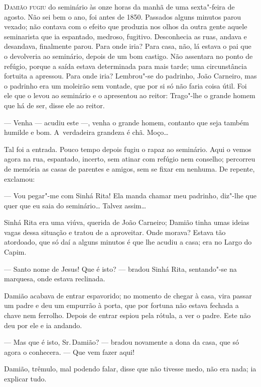 \begin{linenumbers}

\textsc{Damião fugiu} do seminário às onze horas da manhã de uma sexta"-feira de
agosto. Não sei bem o ano, foi antes de 1850. Passados alguns minutos
parou vexado; não contava com o efeito que produzia nos olhos da outra
gente aquele seminarista que ia espantado, medroso, fugitivo.
Desconhecia as ruas, andava e desandava, finalmente parou. Para onde
iria? Para casa, não, lá estava o pai que o devolveria ao seminário,
depois de um bom castigo. Não assentara no ponto de refúgio, porque a
saída estava determinada para mais tarde; uma circunstância fortuita a
apressou. Para onde iria? Lembrou"-se do padrinho, João Carneiro, mas o
padrinho era um moleirão sem vontade, que por si só não faria coisa
útil. Foi ele que o levou ao seminário e o apresentou ao reitor:
Trago"-lhe o grande homem que há de ser, disse ele ao reitor.

--- Venha --- acudiu este ---, venha o grande homem, contanto que seja
também humilde e bom. A~verdadeira grandeza é chã. Moço\ldots{}

Tal foi a entrada. Pouco tempo depois fugiu o rapaz ao seminário. Aqui o
vemos agora na rua, espantado, incerto, sem atinar com refúgio nem
conselho; percorreu de memória as casas de parentes e amigos, sem se
fixar em nenhuma. De repente, exclamou:

--- Vou pegar"-me com Sinhá Rita! Ela manda chamar meu padrinho, diz"-lhe
que quer que eu saia do seminário\ldots{} Talvez assim\ldots{}

Sinhá Rita era uma viúva, querida de João Carneiro; Damião tinha umas
ideias vagas dessa situação e tratou de a aproveitar. Onde morava?
Estava tão atordoado, que só daí a alguns minutos é que lhe acudiu a
casa; era no Largo do Capim.

--- Santo nome de Jesus! Que é isto? --- bradou Sinhá Rita, sentando"-se na
marquesa, onde estava reclinada.

Damião acabava de entrar espavorido; no momento de chegar à casa, vira
passar um padre e deu um empurrão à porta, que por fortuna não estava
fechada a chave nem ferrolho. Depois de entrar espiou pela rótula, a ver
o padre. Este não deu por ele e ia andando.

--- Mas que é isto, Sr.\,Damião? --- bradou novamente a dona da casa, que
só agora o conhecera. --- Que vem fazer aqui!

Damião, trêmulo, mal podendo falar, disse que não tivesse medo, não era
nada; ia explicar tudo.


\end{linenumbers}

